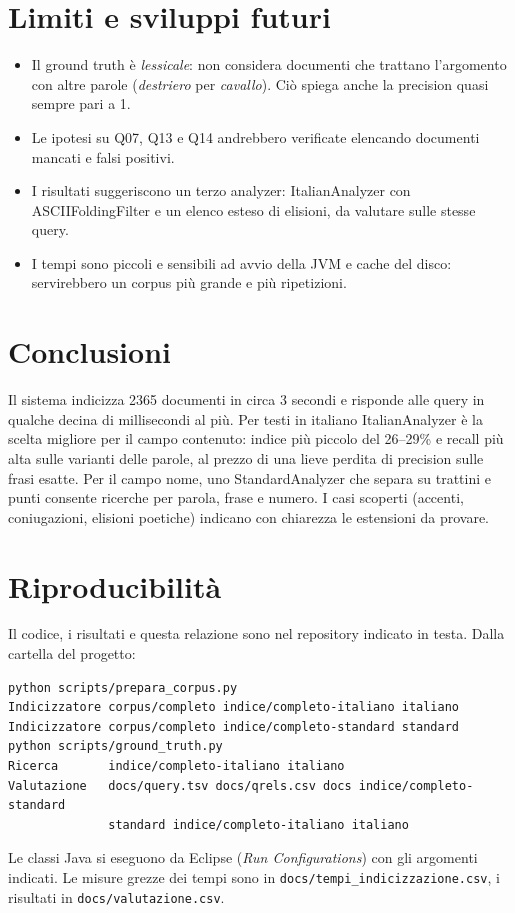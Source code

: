 \documentclass[10pt,a4paper,twocolumn]{article}
\newcommand{\file}[1]{\texttt{#1}}
\newcommand{\cls}[1]{\textsf{#1}}
\begin{document}
\section{Limiti e sviluppi futuri}
\begin{itemize}
  \item Il ground truth è \emph{lessicale}: non considera documenti che trattano l'argomento con altre parole
        (\emph{destriero} per \emph{cavallo}). Ciò spiega anche la precision quasi sempre pari a 1.
  \item Le ipotesi su Q07, Q13 e Q14 andrebbero verificate elencando documenti mancati e falsi positivi.
  \item I risultati suggeriscono un terzo analyzer: \cls{ItalianAnalyzer} con \cls{ASCIIFoldingFilter} e un elenco
        esteso di elisioni, da valutare sulle stesse query.
  \item I tempi sono piccoli e sensibili ad avvio della JVM e cache del disco: servirebbero un corpus più grande
        e più ripetizioni.
\end{itemize}

\section{Conclusioni}
Il sistema indicizza 2365 documenti in circa 3 secondi e risponde alle query in qualche decina di
millisecondi al più. Per testi in
italiano \cls{ItalianAnalyzer} è la scelta migliore per il campo contenuto: indice più piccolo del 26--29\% e
recall più alta sulle varianti delle parole, al prezzo di una lieve perdita di precision sulle frasi esatte. Per
il campo nome, uno \cls{StandardAnalyzer} che separa su trattini e punti consente ricerche per parola, frase e
numero. I casi scoperti (accenti, coniugazioni, elisioni poetiche) indicano con chiarezza le estensioni da
provare.

\section*{Riproducibilità}
Il codice, i risultati e questa relazione sono nel repository indicato in testa. Dalla cartella del progetto:
\begin{lstlisting}
python scripts/prepara_corpus.py
Indicizzatore corpus/completo indice/completo-italiano italiano
Indicizzatore corpus/completo indice/completo-standard standard
python scripts/ground_truth.py
Ricerca       indice/completo-italiano italiano
Valutazione   docs/query.tsv docs/qrels.csv docs indice/completo-standard
              standard indice/completo-italiano italiano
\end{lstlisting}
Le classi Java si eseguono da Eclipse (\emph{Run Configurations}) con gli argomenti indicati. Le misure grezze dei tempi sono in
\file{docs/tempi\_indicizzazione.csv}, i risultati in \file{docs/valutazione.csv}.
\end{document}
